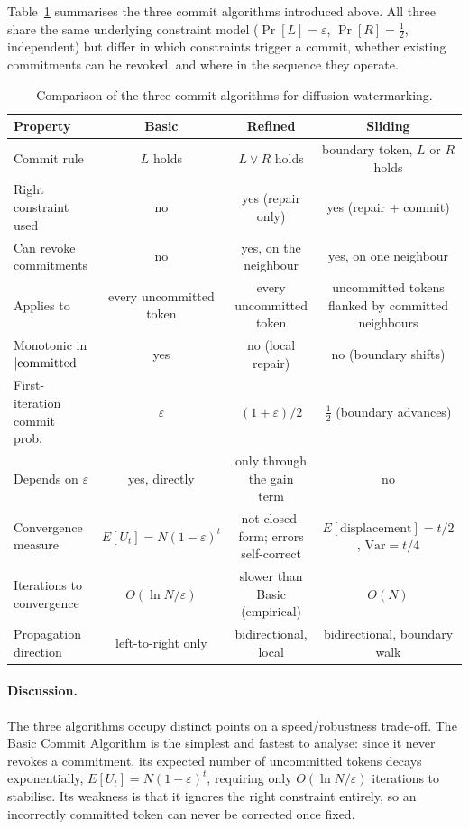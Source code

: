 \documentclass[a4paper,11pt]{llncs}
\begin{document}
Table~\ref{tab:commit-comparison} summarises the three commit
algorithms introduced above. All three share the same underlying
constraint model ($\Pr[L]=\varepsilon$, $\Pr[R]=\tfrac12$, independent)
but differ in which constraints trigger a commit, whether existing
commitments can be revoked, and where in the sequence they operate.
\begin{table}[ht]
\centering
\caption{Comparison of the three commit algorithms for diffusion watermarking.}
\label{tab:commit-comparison}
{\tiny
\begin{tabular}{lccc}
\hline
\textbf{Property} & \textbf{Basic} & \textbf{Refined} & \textbf{Sliding} \\
\hline
Commit rule &
$L$ holds &
$L\lor R$ holds &
boundary token, $L$ or $R$ holds \\
Right constraint used &
no &
yes (repair only) &
yes (repair + commit) \\
Can revoke commitments &
no &
yes, on the neighbour &
yes, on one neighbour \\
Applies to &
every uncommitted token &
every uncommitted token &
uncommitted tokens flanked by committed neighbours \\
Monotonic in $|{\rm committed}|$ &
yes &
no (local repair) &
no (boundary shifts) \\
First-iteration commit prob.\ &
$\varepsilon$ &
$(1+\varepsilon)/2$ &
$\tfrac12$ (boundary advances) \\
Depends on $\varepsilon$ &
yes, directly &
only through the gain term &
no \\
Convergence measure &
$E[U_t]=N(1-\varepsilon)^t$ &
not closed-form; errors self-correct &
$E[\text{displacement}]=t/2$, $\mathrm{Var}=t/4$ \\
Iterations to convergence &
$O(\ln N/\varepsilon)$ &
slower than Basic (empirical) &
$O(N)$ \\
Propagation direction &
left-to-right only &
bidirectional, local &
bidirectional, boundary walk \\
\hline
\end{tabular}
}
\end{table}

\paragraph{Discussion.}
The three algorithms occupy distinct points on a speed/robustness
trade-off. The Basic Commit Algorithm is the simplest and fastest to
analyse: since it never revokes a commitment, its expected number of
uncommitted tokens decays exponentially, $E[U_t]=N(1-\varepsilon)^t$,
requiring only $O(\ln N/\varepsilon)$ iterations to stabilise. Its
weakness is that it ignores the right constraint entirely, so an
incorrectly committed token can never be corrected once fixed.
\end{document}
